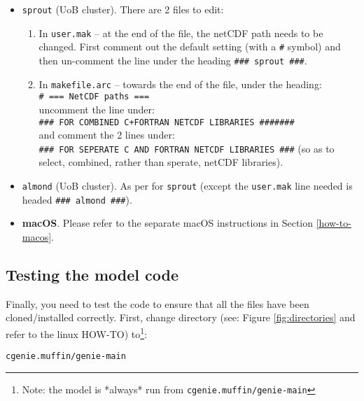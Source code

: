 \documentclass[11pt,fleqn]{book} %
\begin{document}
\begin{itemize}
\vspace{1mm}
\item \texttt{sprout} (UoB cluster). There are 2 files to edit:
\begin{enumerate}[noitemsep]
\item In \texttt{user.mak} -- at the end of the file, the netCDF path needs to be changed. First comment out the default setting (with a \texttt{\#} symbol) and then un-comment the line under the heading \texttt{\#\#\# sprout \#\#\#}.
\item In \texttt{makefile.arc} -- towards the end of the file, under the heading:
\\\texttt{\# === NetCDF paths ===}
\\uncomment the line under:
\\\texttt{\#\#\# FOR COMBINED C+FORTRAN NETCDF LIBRARIES \#\#\#\#\#\#\#}
\\and comment the 2 lines under:
\\\texttt{\#\#\# FOR SEPERATE C AND FORTRAN NETCDF LIBRARIES \#\#\#}
(so as to select, combined, rather than sperate, netCDF libraries).
\end{enumerate}

\vspace{1mm}
\item \texttt{almond} (UoB cluster). As per for \texttt{sprout} (except the \texttt{user.mak} line needed is headed \texttt{\#\#\# almond \#\#\#}).

\vspace{1mm}
\item \textbf{macOS}. Please refer to the separate macOS instructions in Section \ref{how-to-macos}.

\end{itemize}


\subsection{Testing the model code}

\noindent Finally, you need to test the code to ensure that all the files have been cloned/installed correctly.
 First, change directory (see: Figure \ref{fig:directories} and refer to the linux HOW-TO) to\footnote{Note: the model is *always* run from \texttt{cgenie.muffin/genie-main}}:

\vspace{-2mm}
\begin{verbatim}
cgenie.muffin/genie-main
\end{verbatim}
\vspace{-2mm}
\end{document}
